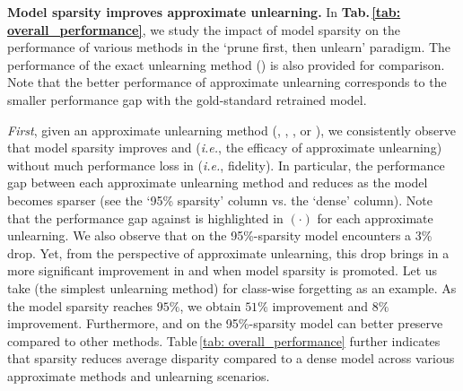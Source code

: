 













\noindent \textbf{Model sparsity improves approximate unlearning.}
In \textbf{Tab.\,\ref{tab: overall_performance}}, we study the impact of model sparsity  on  the performance of various {\MU} methods 
in the `prune first, then unlearn' paradigm. 
The performance of the exact unlearning method  ({\retrain}) is also provided for comparison. 
Note that the better performance of    approximate unlearning  corresponds to the  smaller performance gap with  the gold-standard retrained model. 



\textit{First}, given an approximate unlearning  method ({\FT}, {\GA}, {\FF}, or {\IU}), we consistently observe that model sparsity improves {\UA} and {\MIAF} (\textit{i.e.}, the efficacy of approximate unlearning) without  much performance loss in  {\RA} (\textit{i.e.}, fidelity).
In particular, 
  the  performance gap between each approximate unlearning method and {\retrain} reduces as the model becomes sparser (see the `95\% sparsity' column vs. the `dense' column).
  Note that 
  the performance gap against {\retrain} is highlighted in $(\cdot)$ for each approximate unlearning.
  We also   observe that {\retrain}  on the 95\%-sparsity model encounters a  3\% {\TA} drop. Yet, from the perspective of approximate unlearning, this drop brings in 
  a more significant improvement  in    {\UA} and {\MIAF}  when model sparsity is promoted. Let us take {\FT} (the simplest unlearning method) for class-wise forgetting as an example. As the model sparsity   reaches   $95\%$, we obtain $51\%$ {\UA} improvement and $8\%$ {\MIAF} improvement. 
  Furthermore, {\FT} and {\IU} on the 95\%-sparsity model can better preserve  {\TA} compared to other  methods. 
Table\,\ref{tab: overall_performance} further indicates that sparsity reduces average disparity compared to a dense model across various approximate {\MU} methods and unlearning scenarios.



